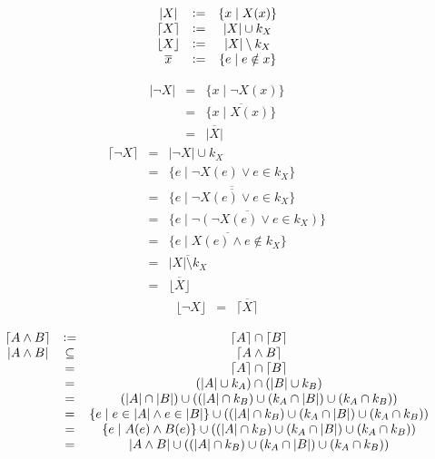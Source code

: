 \documentclass[a4paper,11pt,notitlepage]{scrreprt}
\begin{document}
\[\begin{array}{ccc}
		|X| &\vcentcolon =& \{x \mid X(x)\}\\
		\lceil X \rceil &\vcentcolon =& |X| \cup k_X\\
		\lfloor X \rfloor &\vcentcolon =& |X| \setminus k_X\\
		\overline x &\vcentcolon =& \{e \mid e \notin x\}\\
\end{array}\]

\[\begin{array}{ccc}
		|\neg X| &=& \{x \mid \neg X(x)\}\\
		&=& \overline{\{x \mid X(x)\}}\\
		&=& \overline{|X|}
\end{array}\]
\[\begin{array}{ccc}
		\lceil \neg X \rceil &=& |\neg X| \cup k_X\\
		&=& \{e \mid \neg X(e) \vee e \in k_X\}\\
		&=& \overline{\overline{\{e \mid \neg X(e) \vee e \in k_X\}}}\\
		&=& \overline{\{e \mid \neg (\neg X(e) \vee e \in k_X)\}}\\
		&=& \overline{\{e \mid X(e) \wedge e \notin k_X\}}\\
		&=& \overline{|X| \setminus k_X}\\
		&=& \overline{\lfloor X \rfloor}
\end{array}\]
\[\begin{array}{ccc}
		\lfloor \neg X \rfloor &=& \overline{\lceil X \rceil}
\end{array}\]

\[\begin{array}{ccc}
		\lceil A \wedge B \rceil &\vcentcolon =& \lceil A \rceil \cap \lceil B \rceil\\
		|A \wedge B| &\subseteq& \lceil A \wedge B \rceil\\
		&=& \lceil A \rceil \cap \lceil B \rceil\\
		&=& (|A| \cup k_A) \cap (|B| \cup k_B)\\
		&=& (|A| \cap |B|) \cup ((|A| \cap k_B) \cup (k_A \cap |B|) \cup (k_A \cap k_B))\\
		&=& \{e \mid e \in |A| \wedge e \in |B|\} \cup ((|A| \cap k_B) \cup (k_A \cap |B|) \cup (k_A \cap k_B))\\
		&=& \{e \mid A(e) \wedge B(e)\} \cup ((|A| \cap k_B) \cup (k_A \cap |B|) \cup (k_A \cap k_B))\\
		&=& |A \wedge B| \cup ((|A| \cap k_B) \cup (k_A \cap |B|) \cup (k_A \cap k_B))
\end{array}\]
\end{document}
